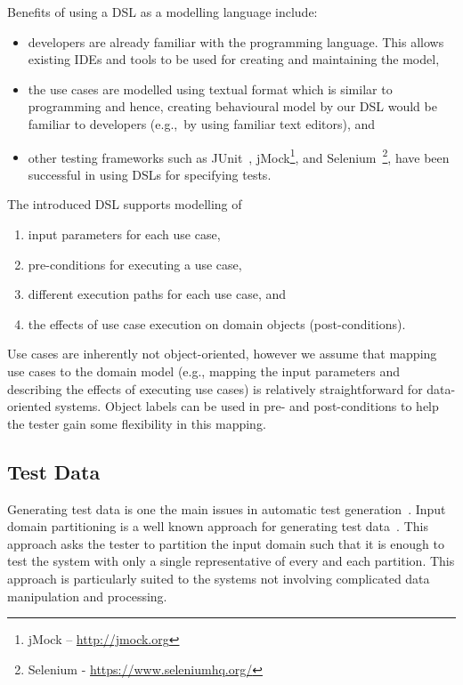 Benefits of using a DSL as a modelling language include: 
\begin{itemize}
	\item developers are already familiar with the programming language. This allows existing IDEs and tools to be used for creating and maintaining the model,
	
	\item the use cases are modelled using textual format which is similar to programming and hence, creating behavioural model by our DSL would be familiar to developers (e.g.,\ by using familiar text editors), and 
	
	\item other testing frameworks such as JUnit~\cite{Beck2000}, jMock\footnote{ jMock – \url{http://jmock.org}}, and Selenium~\footnote{Selenium - \url{https://www.seleniumhq.org/}}, have been successful in using DSLs for specifying tests.
\end{itemize}

The introduced DSL supports modelling of
\begin{enumerate}
	\item input parameters for each use case,
	
	\item pre-conditions for executing a use case, 
	
	\item different execution paths for each use case, and
	
	\item the effects of use case execution on domain objects (post-conditions).
\end{enumerate}

Use cases are inherently not object-oriented, however we assume that mapping use cases to the domain model (e.g., mapping the input parameters and describing the effects of executing use cases) is relatively straightforward for data-oriented systems. Object labels can be used in pre- and post-conditions to help the tester gain some flexibility in this mapping.

\subsection{Test Data}
\label{sec:framework-overview-test-data}
Generating test data is one the main issues in automatic test generation~\cite{Ferguson1996}. Input domain partitioning is a well known approach for generating test data~\cite{Ammann2008}. This approach asks the tester to partition the input domain such that it is enough to test the system with only a single representative of every and each partition. This approach is particularly suited to the systems not involving complicated data manipulation and processing. 

